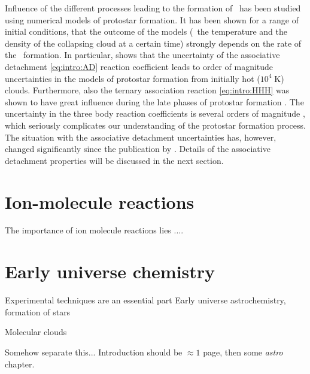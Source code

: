 Influence of the different processes leading to the formation of \Htwo\ 
has been studied using numerical models of protostar formation.
It has been shown for a range of initial conditions, that the outcome
of the models (\ie\ the
temperature and the density of the collapsing cloud at a certain time) strongly
depends on the rate of the \Htwo\ formation. In particular, \cite{glover2006} shows
that the uncertainty of the associative detachment \eqref{eq:intro:AD} reaction
coefficient leads to order of magnitude uncertainties in the models of
protostar formation from initially hot ($10^4\;\text{K}$) clouds. Furthermore,
also the ternary association reaction \eqref{eq:intro:HHH} was shown to have
great influence during the late phases of protostar formation \citep{turk2011}.
The uncertainty in the three body reaction coefficients  is several orders
of magnitude \citep{glover2008}, which seriously complicates our understanding
of the protostar formation process.
The situation with the associative detachment uncertainties has, however,
changed significantly since the publication by \cite{glover2006}. Details
of the associative detachment properties will be discussed in the next section.



\section{Ion-molecule reactions}
The importance of ion molecule reactions lies ....


\section{Early universe chemistry}

Experimental techniques are an essential part
Early universe astrochemistry, formation of stars

Molecular clouds

Somehow separate this... Introduction should be $\approx1$ page, then some {\em astro} chapter.

\endgroup
